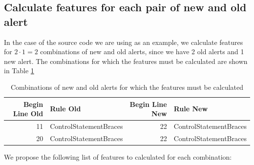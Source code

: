 \documentclass[
]{article}
\begin{document}
\begin{table}[H]

\caption{\label{tab:showing map }Relation between lines of the old version and lines of the new version\label{table_map}}
\centering
{}
\end{table}

\normalsize

\subsection{Calculate features for each pair of new and old alert}

In the case of the source code we are using as an example, we calculate
features for \(2 \cdot 1 = 2\) combinations of new and old alerts, since
we have 2 old alerts and 1 new alert. The combinations for which the
features must be calculated are shown in Table \ref{combination}

\small

\begin{table}[H]

\caption{\label{tab:unnamed-chunk-6}Combinations of new and old alerts for which the features must be calculated \label{combination}}
\centering
\begin{tabular}[t]{r|l|r|l}
\hline
Begin Line Old & Rule Old & Begin Line New & Rule New\\
\hline
11 & ControlStatementBraces & 22 & ControlStatementBraces\\
\hline
20 & ControlStatementBraces & 22 & ControlStatementBraces\\
\hline
\end{tabular}
\end{table}

\normalsize

We propose the following list of features to calculated for each
combination:
\end{document}
